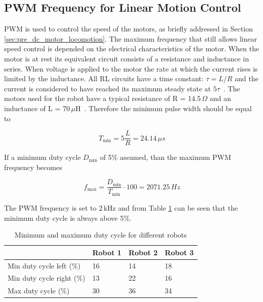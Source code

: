 \subsection{PWM Frequency for Linear Motion Control}
\label{sec:cd_pwm_frequency}

PWM is used to control the speed of the motors, as briefly addressed in Section \ref{sec:pre_dc_motor_locomotion}.
The maximum frequency that still allows linear speed control is depended on the electrical characteristics of the motor.
When the motor is at rest its equivalent circuit consists of a resistance and inductance in series.
When voltage is applied to the motor the rate at which the current rises is limited by the inductance. 
All RL circuits have a time constant: $\tau = L / R$ and the current is considered to have reached its maximum steady state at $5\tau$~\cite{pmw_linear_motion_2017}. 
The motors used for the robot have a typical resistance of R = 14.5\,$\Omega$ and an inductance of L = 70\,$\mu$H~\cite{gearmotor_206-110_2017}.
Therefore the minimum pulse width should be equal to

\begin{equation}
T_{\min} = 5 \frac{L}{R} = 24.14\,\mu s
\end{equation}

\noindent
If a minimum duty cycle $D_{\min}$ of 5\% assumed, than the maximum PWM frequency becomes

\begin{equation}
f_{\max} = \frac{D_{\min}}{T_{\min}}\cdot 100 = 2071.25\,Hz
\end{equation}

\noindent
The PWM frequency is set to 2\,kHz and from Table \ref{tab:duty_cycle} can be seen that the minimum duty cycle is always above 5\%.

\begin{table}[t]
	\centering
	\caption{Minimum and maximum duty cycle for different robots}
	\label{tab:duty_cycle}
	\begin{tabular}{|l||l|l|l|} 
		\hline
						          & Robot 1 & Robot 2 & Robot 3 \\
		\hline \hline
 		Min duty cycle left (\%)  & 16      & 14      & 18      \\
		Min duty cycle right (\%) & 13      & 22      & 16      \\
		Max duty cycle (\%)       & 30      & 36      & 34	    \\
		\hline
	\end{tabular}
\end{table}

